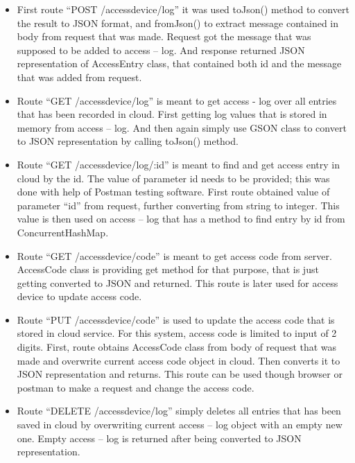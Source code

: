 \begin{itemize}

\item First route “POST /accessdevice/log” it was used toJson() method to convert the result to JSON format, and fromJson() to extract message contained in body from request that was made. Request got the message that was supposed to be added to access – log. And response returned JSON representation of AccessEntry class, that contained both id and the message that was added from request. 

\item Route “GET /accessdevice/log” is meant to get access - log over all entries that has been recorded in cloud. First getting log values that is stored in memory from access – log. And then again simply use GSON class to convert to JSON representation by calling toJson() method.

\item Route “GET /accessdevice/log/:id” is meant to find and get access entry in cloud by the id. The value of parameter id needs to be provided; this was done with help of Postman testing software. First route obtained value of parameter “id” from request, further converting from string to integer. This value is then used on access – log that has a method to find entry by id from ConcurrentHashMap. 

\item Route “GET /accessdevice/code” is meant to get access code from server. AccessCode class is providing get method for that purpose, that is just getting converted to JSON and returned. This route is later used for access device to update access code.

\item Route “PUT /accessdevice/code” is used to update the access code that is stored in cloud service. For this system, access code is limited to input of 2 digits. First, route obtains AccessCode class from body of request that was made and overwrite current access code object in cloud. Then converts it to JSON representation and returns. This route can be used though browser or postman to make a request and change the access code. 

\item Route “DELETE /accessdevice/log” simply deletes all entries that has been saved in cloud by overwriting current access – log object with an empty new one. Empty access – log is returned after being converted to JSON representation. 

\end{itemize}

